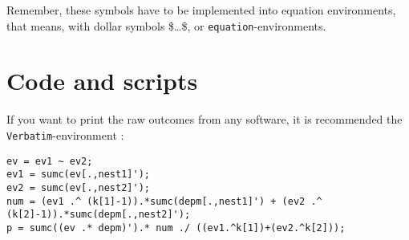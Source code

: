 \documentclass[12pt]{article}
\begin{document}
Remember, these symbols have to be implemented into equation  environments, that means, with dollar symbols \$\ldots\$, or \texttt{equation}-environments.

\newpage 



\section*{Code and scripts}

If you want to print the raw outcomes from any software, it is recommended the \texttt{Verbatim}-environment :
\begin{Verbatim}[frame = single, fontsize = \footnotesize]
ev = ev1 ~ ev2;
ev1 = sumc(ev[.,nest1]');
ev2 = sumc(ev[.,nest2]');
num = (ev1 .^ (k[1]-1)).*sumc(depm[.,nest1]') + (ev2 .^ (k[2]-1)).*sumc(depm[.,nest2]');
p = sumc((ev .* depm)').* num ./ ((ev1.^k[1])+(ev2.^k[2]));
\end{Verbatim}
\end{document}
